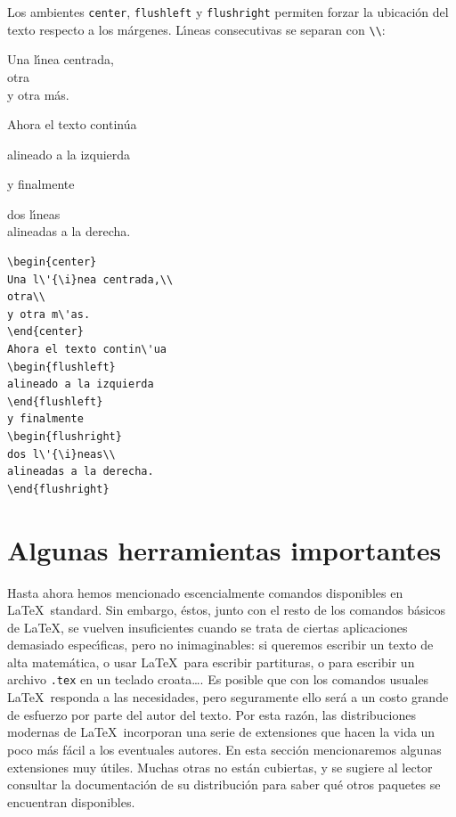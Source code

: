 {Los ambientes \verb+center+, \verb+flushleft+ y \verb+flushright+
permiten forzar la ubicaci{\'o}n del texto respecto a los m{\'a}rgenes.
L{\'\i}neas consecutivas se separan con \verb+\\+:

\vspace{.3cm}
{\small
\begin{minipage}[t]{5cm}
\begin{center}
Una l\'{\i}nea centrada,\\
otra\\ 
y otra m{\'a}s.
\end{center}
Ahora el texto contin{\'u}a
\begin{flushleft}
alineado a la izquierda
\end{flushleft}
y finalmente
\begin{flushright}
dos l\'{\i}neas\\
alineadas a la derecha.
\end{flushright}
\end{minipage}
\hspace{2cm}
\begin{minipage}[t]{5cm}
\begin{verbatim}
\begin{center}
Una l\'{\i}nea centrada,\\
otra\\ 
y otra m\'as.
\end{center}
Ahora el texto contin\'ua
\begin{flushleft}
alineado a la izquierda
\end{flushleft}
y finalmente
\begin{flushright}
dos l\'{\i}neas\\
alineadas a la derecha.
\end{flushright}
\end{verbatim}
\end{minipage}
}


\section{Algunas herramientas importantes}

Hasta ahora hemos mencionado escencialmente comandos disponibles en
\LaTeX\ standard. Sin embargo, \'estos, junto con el resto de los
comandos b\'asicos de \LaTeX, se vuelven insuficientes cuando se trata
de ciertas aplicaciones demasiado espec\'{\i}ficas, pero no
inimaginables: si queremos escribir un texto de
alta matem\'atica, o usar \LaTeX\ para escribir partituras, o para
escribir un archivo \verb+.tex+ en un teclado croata\ldots. Es posible
que con los comandos usuales \LaTeX\ responda a las necesidades, pero
seguramente ello ser\'a a un costo grande de esfuerzo por parte del
autor del texto. Por esta raz\'on, las distribuciones modernas de
\LaTeX\ incorporan una serie de extensiones que hacen la vida
un poco m\'as f\'acil a los eventuales autores. En esta secci\'on
mencionaremos algunas extensiones muy \'utiles. Muchas otras no
est\'an cubiertas, y se sugiere al lector consultar la documentaci\'on
de su distribuci\'on para saber qu\'e otros paquetes se encuentran
disponibles. 


}
